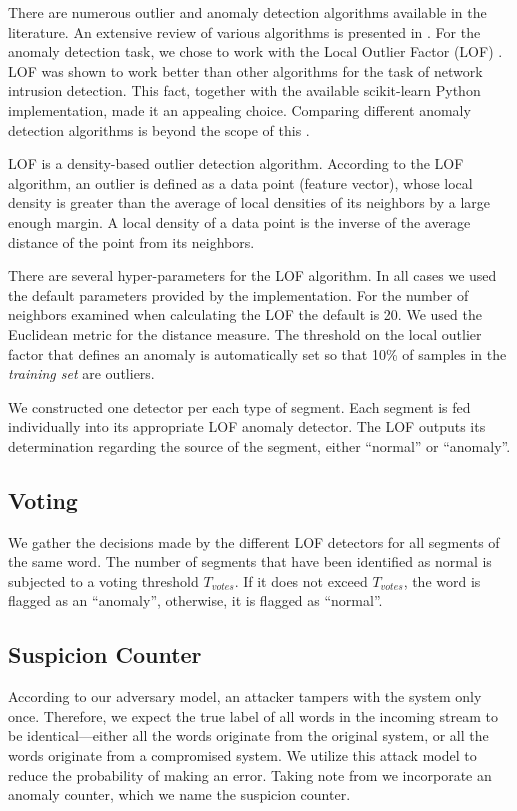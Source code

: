 \documentclass[english]{llncs}
\newcommand{\sublevel}[1]{\subsection{#1}}
\newcommand{\sublevel}[1]{\section{#1}}
\begin{document}
  There are numerous outlier and anomaly detection algorithms available in the literature. %
  An extensive review of various algorithms is presented in \cite{pimentel2014review}. For the anomaly detection task, we chose to work with the Local Outlier Factor (LOF)
   \cite{breunig2000lof}. LOF was shown to work better than other algorithms for the task of network intrusion detection\cite{lazarevic2003comparative}. This fact, together with the available scikit-learn \cite{scikit-learn} Python implementation, made it an appealing choice. Comparing different anomaly detection algorithms is beyond the scope of this \iftoggle{paper} {paper} {work}.
  
  LOF is a density-based outlier detection algorithm. According to the LOF algorithm, an outlier is defined as a data point (feature vector), whose local density is greater than the average of local densities of its neighbors by a large enough margin. A local density of a data point is the inverse of the average distance of the point from its neighbors.
  
  There are several hyper-parameters for the LOF algorithm. In all cases we used the default parameters provided by the implementation. For the number of neighbors examined when calculating the LOF the default is 20. We used the Euclidean metric for the distance measure. The threshold on the local outlier factor that defines an anomaly is automatically set so that 10\% of samples in the \textit{training set} are outliers.
  
  We constructed one
  detector per
  each type of segment. Each segment is fed individually into its appropriate LOF anomaly detector. The LOF outputs its determination regarding the source of the segment, either ``normal'' or ``anomaly''.
  
\sublevel{Voting}
  We gather the decisions made by the different LOF detectors for all segments of the same word. The number of segments that have been identified as normal is subjected to a voting threshold $T_{votes}$. If it does not exceed $T_{votes}$, the word is flagged as an ``anomaly'', otherwise, it is flagged as ``normal''.


  
\sublevel{Suspicion Counter}
  According to our adversary model, an attacker tampers with the system only once. Therefore, we expect the true label of all words in the incoming stream to be identical---either all the words originate from the original system, or all the words originate from a compromised system. We utilize this attack model to reduce the probability of making an error. Taking note from \cite{kneib2018scission} we incorporate an anomaly counter, which we name the suspicion counter.
  
\end{document}

